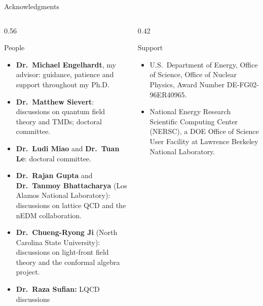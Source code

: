 \begin{frame}{Acknowledgments}
  \begin{columns}[t]
    \begin{column}{0.56\textwidth}
      \begin{block}{People}
        \begin{itemize}
          \item \textbf{Dr.\ Michael Engelhardt}, my advisor: guidance, patience and support throughout my Ph.D.
          \item \textbf{Dr.\ Matthew Sievert}: discussions on quantum field theory and TMDs; doctoral committee.
          \item \textbf{Dr.\ Ludi Miao} and \textbf{Dr.\ Tuan Le}: doctoral committee.
          \item \textbf{Dr.\ Rajan Gupta} and \textbf{Dr.\ Tanmoy Bhattacharya} (Los Alamos National Laboratory): discussions on lattice QCD and the nEDM collaboration.
          \item \textbf{Dr.\ Chueng-Ryong Ji} (North Carolina State University): discussions on light-front field theory and the conformal algebra project.
          \item \textbf{Dr.\ Raza Sufian:} LQCD discussions
        \end{itemize}
      \end{block}
    \end{column}
    \begin{column}{0.42\textwidth}
      \begin{block}{Support}
        \begin{itemize}
          \item U.S.\ Department of Energy, Office of Science, Office of Nuclear Physics, Award Number DE-FG02-96ER40965.
          \item National Energy Research Scientific Computing Center (NERSC), a DOE Office of Science User Facility at Lawrence Berkeley National Laboratory.
        \end{itemize}
      \end{block}
    \end{column}
  \end{columns}
\end{frame}
